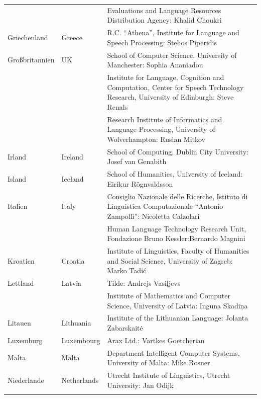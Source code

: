 \documentclass[]{../../metanetpaper}
\begin{document}
\begin{longtable}{@{}llp{113mm}@{}}
  & & Evaluations and Language Resources Distribution Agency: Khalid Choukri\\ \addlinespace 
  Griechenland & \textcolor{grey1}{Greece} & R.C. “Athena”, Institute for Language and Speech Processing: Stelios Piperidis\\ \addlinespace
  Großbritannien & \textcolor{grey1}{UK} & 
  School of Computer Science, University of Manchester: Sophia Ananiadou \\ \addlinespace 
  & & Institute for Language, Cognition and Computation, Center for Speech Technology Research, University of Edinburgh: Steve Renals \\ \addlinespace 
  & & Research Institute of Informatics and Language Processing, University of Wolverhampton: Ruslan Mitkov \\ \addlinespace 
  Irland & \textcolor{grey1}{Ireland} & School of Computing, Dublin City University: Josef van Genabith\\ \addlinespace
  Island & \textcolor{grey1}{Iceland} & School of Humanities, University of Iceland: Eiríkur Rögnvaldsson\\ \addlinespace
  Italien & \textcolor{grey1}{Italy} & Consiglio Nazionale delle Ricerche, Istituto di Linguistica Computazionale “Antonio Zampolli”: Nicoletta Calzolari\\ \addlinespace
  & & Human Language Technology Research Unit, Fondazione Bruno Kessler:\newline Bernardo Magnini\\ \addlinespace 
  Kroatien & \textcolor{grey1}{Croatia} & Institute of Linguistics, Faculty of Humanities and Social Science, University of Zagreb: Marko Tadić \\ \addlinespace
  Lettland & \textcolor{grey1}{Latvia} & Tilde: Andrejs Vasiļjevs\\ \addlinespace 
  & & Institute of Mathematics and Computer Science, University of Latvia: Inguna Skadiņa\\ \addlinespace
  Litauen & \textcolor{grey1}{Lithuania} & Institute of the Lithuanian Language: Jolanta Zabarskaitė\\ \addlinespace
  Luxemburg & \textcolor{grey1}{Luxembourg} & Arax Ltd.: Vartkes Goetcherian\\ \addlinespace
  Malta & \textcolor{grey1}{Malta} & Department Intelligent Computer Systems, University of Malta: Mike Rosner\\ \addlinespace
  Niederlande & \textcolor{grey1}{Netherlands} & Utrecht Institute of Linguistics, Utrecht University: Jan Odijk\\ \addlinespace 

\end{longtable}
\end{document}

